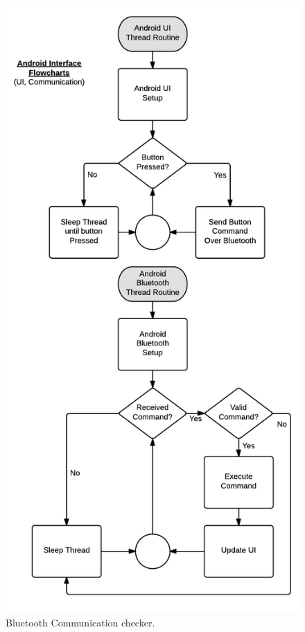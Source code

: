 	\begin{figure}[H]
		\centering
			\includegraphics[scale=0.4]{img/flowchart-android}
		\caption{Bluetooth Communication checker.}
	\end{figure}
	
	
	

